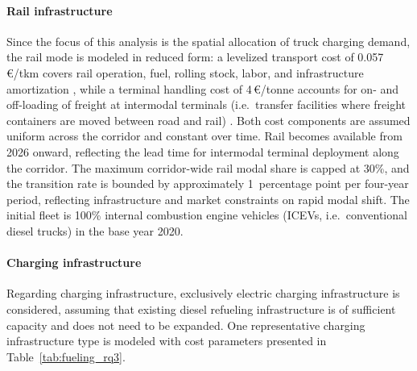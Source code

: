     \paragraph*{Rail infrastructure}
    Since the focus of this analysis is the spatial allocation of truck charging demand, the rail mode is modeled in reduced form: a levelized transport cost of 0.057\,\euro/tkm covers rail operation, fuel, rolling stock, labor, and infrastructure amortization \citep{Janic2007, BAKKER2025104076}, while a terminal handling cost of 4\,\euro/tonne accounts for on- and off-loading of freight at intermodal terminals (i.e.\ transfer facilities where freight containers are moved between road and rail) \citep{Wiegmans2018}. Both cost components are assumed uniform across the corridor and constant over time. Rail becomes available from 2026 onward, reflecting the lead time for intermodal terminal deployment along the corridor. The maximum corridor-wide rail modal share is capped at 30\%, and the transition rate is bounded by approximately 1~percentage point per four-year period, reflecting infrastructure and market constraints on rapid modal shift. The initial fleet is 100\% internal combustion engine vehicles (ICEVs, i.e.\ conventional diesel trucks) in the base year 2020.

    \paragraph*{Charging infrastructure}
            Regarding charging infrastructure, exclusively electric charging infrastructure is considered, assuming that existing diesel refueling infrastructure is of sufficient capacity and does not need to be expanded. One representative charging infrastructure type is modeled with cost parameters presented in Table~\ref{tab:fueling_rq3}.

    \begin{table}[H]
            \centering
            \caption{Assumptions of parameters related to the deployment of charging infrastructure.}
            \label{tab:fueling_rq3}
            \end{table}

